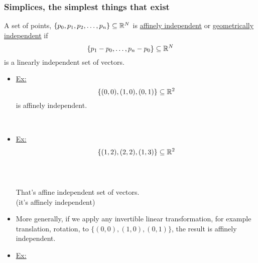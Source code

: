 \documentclass[../notes.tex]{subfiles}
\begin{document}
\subsubsection{Simplices, the simplest things that exist}
\begin{definition}
    A set of points, $\{p_0,p_1,p_2,\dots,p_n\}\subseteq \mathbb{R}^N$ is
    \underline{affinely independent} or \underline{geometrically independent}
    if 
    \[
        \{p_1-p_0,\dots,p_n-p_0\}\subseteq \mathbb{R}^N
    \]
    is a linearly independent set of vectors.
\end{definition}
\begin{itemize}
    \item \underline{Ex:}
        \[
            \{(0,0), (1,0), (0,1)\}\subseteq\mathbb{R}^2
        \]
        is affinely independent.\\
        \\
    \item \underline{Ex:}
        \[
            \{(1,2), (2,2), (1,3)\}\subseteq\mathbb{R}^2
        \]\\
        \\
        That's affine independent set of vectors.\\
        (it's affinely independent)
    \item More generally, if we apply any invertible linear transformation, for example
        translation, rotation, to $\{(0,0),(1,0),(0,1)\}$, the result is affinely 
        independent.
    \item \underline{Ex:}

\end{itemize}
\end{document}
